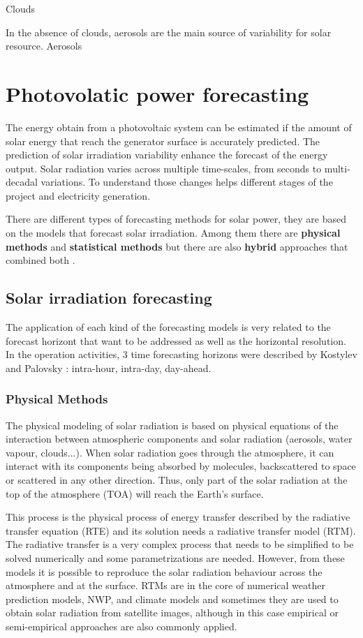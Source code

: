 Clouds

In the absence of clouds, aerosols are the main source of variability for solar resource. Aerosols
\section{Photovolatic power forecasting}

The energy obtain from a photovoltaic system can be estimated if the amount of solar energy that reach the generator surface is accurately predicted. The prediction of solar irradiation variability enhance the forecast of the energy output. Solar radiation varies across multiple time-scales, from seconds to multi-decadal variations. To understand those changes helps different stages of the project and electricity generation.

There are different types of forecasting methods for solar power, they are based on the models that forecast solar irradiation. Among them there are \textbf{physical methods} and \textbf{statistical methods} but there are also \textbf{hybrid} approaches that combined both \cite*{Diagne2013, Tovar-Pescador2008}.  


\subsection{Solar irradiation forecasting}

The application of each kind of the forecasting models is very related to the forecast horizont that want to be addressed as well as the horizontal resolution. In the operation activities, 3 time forecasting horizons were described by Kostylev and Palovsky \cite*{kostylev2011solar}: intra-hour, intra-day, day-ahead. 

\subsubsection{Physical Methods}

The physical modeling of solar radiation is based on physical equations of the interaction between atmospheric components and solar radiation (aerosols, water vapour, clouds...). When solar radiation goes through the atmosphere, it can interact with its components being absorbed by molecules, backscattered to space or scattered in any other direction. Thus, only part of the solar radiation at the top of the atmosphere (TOA) will reach the Earth's surface.

This process is the physical process of energy transfer described by the radiative transfer equation (RTE) and its solution needs a radiative transfer model (RTM). The radiative transfer is a very complex process that needs to be simplified to be solved numerically and some parametrizations are needed. However, from these models it is possible to reproduce the solar radiation behaviour across the atmosphere and at the surface. RTMs are in the core of numerical weather prediction models, NWP, and climate models and sometimes they are used to obtain solar radiation from satellite images, although in this case empirical or semi-empirical approaches are also commonly applied.

